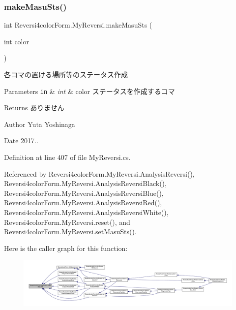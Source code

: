 \subsubsection{\texorpdfstring{make\+Masu\+Sts()}{makeMasuSts()}}
{\footnotesize\ttfamily int Reversi4color\+Form.\+My\+Reversi.\+make\+Masu\+Sts (\begin{DoxyParamCaption}\item[{int}]{color }\end{DoxyParamCaption})\hspace{0.3cm}{\ttfamily [private]}}



各コマの置ける場所等のステータス作成 


\begin{DoxyParams}[1]{Parameters}
\mbox{\tt in}  & {\em int} & color ステータスを作成するコマ \\
\hline
\end{DoxyParams}
\begin{DoxyReturn}{Returns}
ありません 
\end{DoxyReturn}
\begin{DoxyAuthor}{Author}
Yuta Yoshinaga 
\end{DoxyAuthor}
\begin{DoxyDate}{Date}
2017.. 
\end{DoxyDate}


Definition at line 407 of file My\+Reversi.\+cs.



Referenced by Reversi4color\+Form.\+My\+Reversi.\+Analysis\+Reversi(), Reversi4color\+Form.\+My\+Reversi.\+Analysis\+Reversi\+Black(), Reversi4color\+Form.\+My\+Reversi.\+Analysis\+Reversi\+Blue(), Reversi4color\+Form.\+My\+Reversi.\+Analysis\+Reversi\+Red(), Reversi4color\+Form.\+My\+Reversi.\+Analysis\+Reversi\+White(), Reversi4color\+Form.\+My\+Reversi.\+reset(), and Reversi4color\+Form.\+My\+Reversi.\+set\+Masu\+Sts().

Here is the caller graph for this function\+:\nopagebreak
\begin{figure}[H]
\begin{center}
\leavevmode
\includegraphics[width=350pt]{class_reversi4color_form_1_1_my_reversi_afdfd5f0fc3a4ed4e24bcf67ead0bb980_icgraph}
\end{center}
\end{figure}
\mbox{\label{class_reversi4color_form_1_1_my_reversi_aeb24b855c540f99c901de08b11af1dd6}} 
